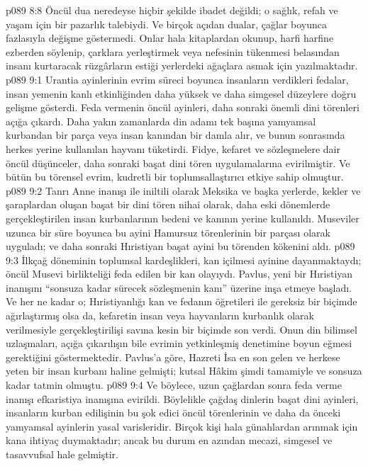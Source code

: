 \vs p089 8:8 Öncül dua neredeyse hiçbir şekilde ibadet değildi; o sağlık, refah ve yaşam için bir pazarlık talebiydi. Ve birçok açıdan dualar, çağlar boyunca fazlasıyla değişme göstermedi. Onlar hala kitaplardan okunup, harfi harfine ezberden söylenip, çarklara yerleştirmek veya nefesinin tükenmesi belasından insanı kurtaracak rüzgârların estiği yerlerdeki ağaçlara asmak için yazılmaktadır.
\vs p089 9:1 Urantia ayinlerinin evrim süreci boyunca insanların verdikleri fedalar, insan yemenin kanlı etkinliğinden daha yüksek ve daha simgesel düzeylere doğru gelişme gösterdi. Feda vermenin öncül ayinleri, daha sonraki önemli dini törenleri açığa çıkardı. Daha yakın zamanlarda din adamı tek başına yamyamsal kurbandan bir parça veya insan kanından bir damla alır, ve bunun sonrasında herkes yerine kullanılan hayvanı tüketirdi. Fidye, kefaret ve sözleşmelere dair öncül düşünceler, daha sonraki başat dini tören uygulamalarına evirilmiştir. Ve bütün bu törensel evrim, kudretli bir toplumsallaştırıcı etkiye sahip olmuştur.
\vs p089 9:2 Tanrı Anne inanışı ile iniltili olarak Meksika ve başka yerlerde, kekler ve şaraplardan oluşan başat bir dini tören nihai olarak, daha eski dönemlerde gerçekleştirilen insan kurbanlarının bedeni ve kanının yerine kullanıldı. Museviler uzunca bir süre boyunca bu ayini Hamursuz törenlerinin bir parçası olarak uyguladı; ve daha sonraki Hıristiyan başat ayini bu törenden kökenini aldı.
\vs p089 9:3 İlkçağ döneminin toplumsal kardeşlikleri, kan içilmesi ayinine dayanmaktaydı; öncül Musevi birlikteliği feda edilen bir kan olayıydı. Pavlus, yeni bir Hıristiyan inanışını “sonsuza kadar sürecek sözleşmenin kanı” üzerine inşa etmeye başladı. Ve her ne kadar o; Hıristiyanlığı kan ve fedanın öğretileri ile gereksiz bir biçimde ağırlaştırmış olsa da, kefaretin insan veya hayvanların kurbanlık olarak verilmesiyle gerçekleştirilişi savına kesin bir biçimde son verdi. Onun din bilimsel uzlaşmaları, açığa çıkarılışın bile evrimin yetkinleşmiş denetimine boyun eğmesi gerektiğini göstermektedir. Pavlus’a göre, Hazreti İsa en son gelen ve herkese yeten bir insan kurbanı haline gelmişti; kutsal Hâkim şimdi tamamiyle ve sonsuza kadar tatmin olmuştu.
\vs p089 9:4 Ve böylece, uzun çağlardan sonra feda verme inanışı efkaristiya inanışına evirildi. Böylelikle çağdaş dinlerin başat dini ayinleri, insanların kurban edilişinin bu şok edici öncül törenlerinin ve daha da önceki yamyamsal ayinlerin yasal varisleridir. Birçok kişi hala günahlardan arınmak için kana ihtiyaç duymaktadır; ancak bu durum en azından mecazi, simgesel ve tasavvufsal hale gelmiştir.
